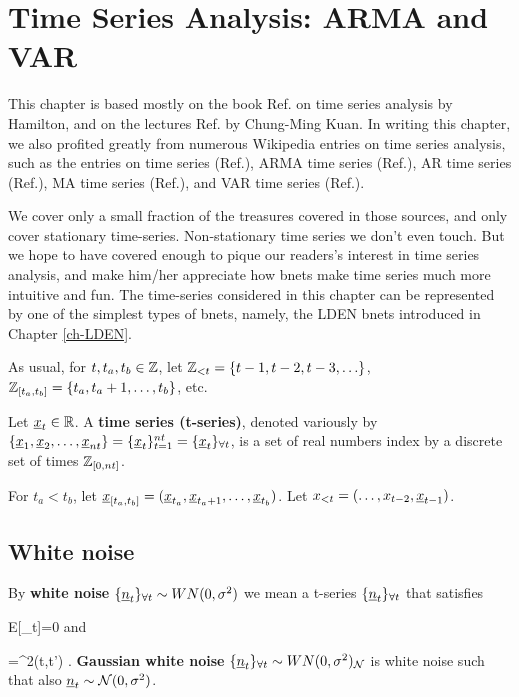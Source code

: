 \chapter{Time Series Analysis:
ARMA and VAR}\label{ch-time-arma}



This chapter is based mostly
on the book  Ref.\cite{hamilton2020time}
on time series analysis by Hamilton,
and on the lectures Ref. \cite{t-series-kuan}
by Chung-Ming Kuan.
In writing this chapter, we also profited greatly
from numerous Wikipedia entries on time series
analysis,
such as  the entries
on
time series (Ref.\cite{wiki-time-series}),
ARMA time series (Ref.\cite{wiki-ARMA}),
AR time series (Ref.\cite{wiki-AR}),
MA time series (Ref.\cite{wiki-MA}), and
VAR time series (Ref.\cite{wiki-VAR}).



We cover only a small fraction
 of the  treasures
covered in those sources,
and only
cover stationary
time-series. Non-stationary
time series
we don't even touch.
But we hope to have covered
enough to pique
our readers's interest in time series analysis,
and make him/her appreciate
how bnets make
 time series much more
intuitive and fun.
The time-series
considered in this chapter
can
be represented
by one of the
simplest
types of
bnets, namely, the LDEN bnets
introduced in
Chapter \ref{ch-LDEN}.



As usual, for $t, t_a, t_b\in {\mathbb{Z}}$,
 let
 ${\mathbb{Z}}_{<t}=
\{t-1, t-2, t-3, \ldots\}$,
${\mathbb{Z}}_{[t_a, t_b]}=\{t_a, t_a+1,
\ldots, t_b\}$, etc.

Let $\rvx_t\in \RR$.
A
{\bf time series (t-series)},
denoted variously by
$\{\rvx_1, \rvx_2, \ldots,
\rvx_{nt}\}
=\{\rvx_t\}_{t=1}^{nt}
=\tseries{\rvx_t}$,
is a set of real numbers
index by a discrete set of times
${\mathbb{Z}}_{[0, nt]}$.


For $t_a<t_b$, let
$\rvx_{[t_a, t_b]}=(\rvx_{t_a},
\rvx_{t_a+1},
 \ldots, \rvx_{t_b})$.
Let $x_{<t}=(\ldots, x_{t-2}, \rvx_{t-1})$.

\section{White noise}

By {\bf white noise}
$\tseries{\rvn_t}\sim  WN(0, \s^2)$
we mean a t-series $\tseries{\rvn_t}$
that satisfies

\beq
E[\rvn_t]=0
\eeq
and

\beq
{}=\s^2\delta(t,t')
\;.
\eeq
{\bf Gaussian white noise}
$\tseries{\rvn_t}\sim WN(0, \s^2)_\caln$
is white noise such that also
$\rvn_t\sim \caln(0, \s^2)$.

